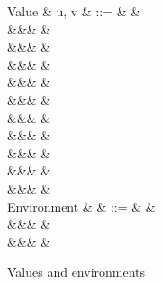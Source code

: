 \begin{figure}
\begin{syntaxfig}
\small
\mbox{Value}
&
u, v
&
::=
&
\exUnit
&
\\
&&&
&
\\
&&&
&
\\
&&&
&
\\
&&&
&
\\
&&&
&
\\
&&&
&
\\
&&&
&
\\
&&&
\exClosure{\rho}{\exFun{\sigma}}
&
\\
&&&
&
\\
&&&
&
\\[1mm]
\mbox{Environment}
&
\rho
&
::=
&
\envEmpty
&
\\
&&&
&
\\
&&&
&
\end{syntaxfig}
\caption{Values and environments}
\end{figure}
